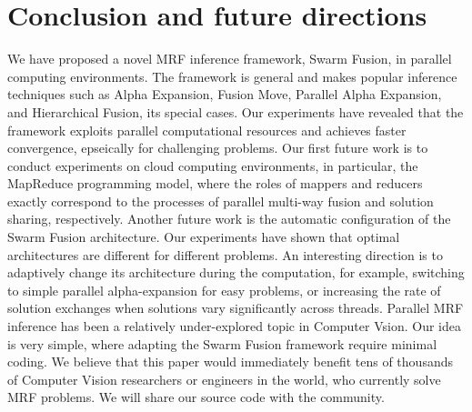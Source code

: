\section{Conclusion and future directions}
We have proposed a novel MRF inference framework, Swarm Fusion, in
parallel computing environments. The framework is general and makes
popular inference techniques such as Alpha Expansion, Fusion Move,
Parallel Alpha Expansion, and Hierarchical Fusion, its special cases. Our
experiments have revealed that the framework exploits parallel
computational resources and achieves faster convergence, epseically for
challenging problems.  Our first future work is to conduct experiments
on cloud computing environments, in particular, the MapReduce
programming model, where the roles of mappers and reducers exactly
correspond to the processes of parallel multi-way fusion and solution
sharing, respectively.  Another future work is the automatic
configuration of the Swarm Fusion architecture.  Our experiments have
shown that optimal architectures are different for different problems.
An interesting direction is to adaptively change its architecture during
the computation, for example, switching to simple parallel
alpha-expansion for easy problems, or increasing the rate of solution
exchanges when solutions vary significantly across threads.
%
Parallel MRF inference has been a relatively under-explored topic in
Computer Vsion. Our idea is very simple, where adapting the Swarm Fusion
framework require minimal coding. We believe that this paper would
immediately benefit tens of thousands of Computer Vision researchers or
engineers in the world, who currently solve MRF problems. We will share
our source code with the community.
